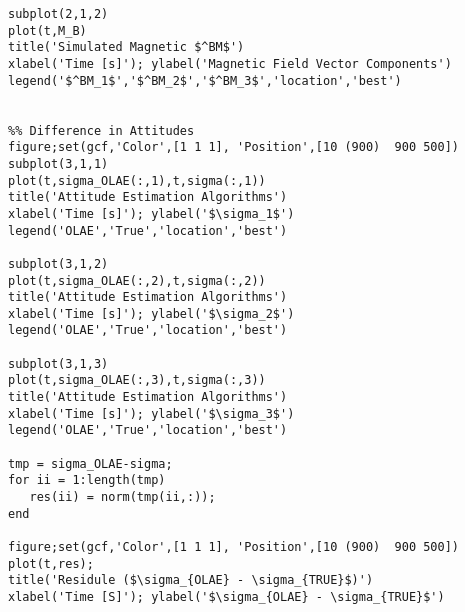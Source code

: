 \documentclass[11pt]{aiaa-tc}%
\begin{document}
\begin{lstlisting}
subplot(2,1,2)
plot(t,M_B)
title('Simulated Magnetic $^BM$')
xlabel('Time [s]'); ylabel('Magnetic Field Vector Components')
legend('$^BM_1$','$^BM_2$','$^BM_3$','location','best')


%% Difference in Attitudes
figure;set(gcf,'Color',[1 1 1], 'Position',[10 (900)  900 500])
subplot(3,1,1)
plot(t,sigma_OLAE(:,1),t,sigma(:,1))
title('Attitude Estimation Algorithms')
xlabel('Time [s]'); ylabel('$\sigma_1$')
legend('OLAE','True','location','best')

subplot(3,1,2)
plot(t,sigma_OLAE(:,2),t,sigma(:,2))
title('Attitude Estimation Algorithms')
xlabel('Time [s]'); ylabel('$\sigma_2$')
legend('OLAE','True','location','best')

subplot(3,1,3)
plot(t,sigma_OLAE(:,3),t,sigma(:,3))
title('Attitude Estimation Algorithms')
xlabel('Time [s]'); ylabel('$\sigma_3$')
legend('OLAE','True','location','best')

tmp = sigma_OLAE-sigma;
for ii = 1:length(tmp)
   res(ii) = norm(tmp(ii,:));
end

figure;set(gcf,'Color',[1 1 1], 'Position',[10 (900)  900 500])
plot(t,res);
title('Residule ($\sigma_{OLAE} - \sigma_{TRUE}$)')
xlabel('Time [S]'); ylabel('$\sigma_{OLAE} - \sigma_{TRUE}$')


\end{lstlisting}
\end{document}
